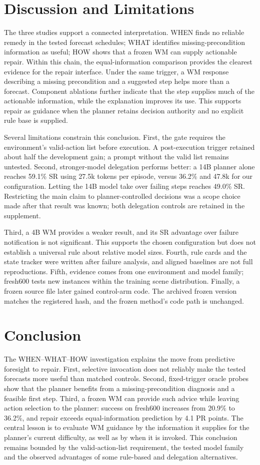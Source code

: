 \documentclass[runningheads]{llncs}
\begin{document}
\section{Discussion and Limitations}
The three studies support a connected interpretation. WHEN finds no reliable remedy in the tested forecast schedules; WHAT identifies missing-precondition information as useful; HOW shows that a frozen WM can supply actionable repair. Within this chain, the equal-information comparison provides the clearest evidence for the repair interface. Under the same trigger, a WM response describing a missing precondition and a suggested step helps more than a forecast. Component ablations further indicate that the step supplies much of the actionable information, while the explanation improves its use. This supports repair as guidance when the planner retains decision authority and no explicit rule base is supplied.

Several limitations constrain this conclusion. First, the gate requires the environment's valid-action list before execution. A post-execution trigger retained about half the development gain; a prompt without the valid list remains untested. Second, stronger-model delegation performs better: a 14B planner alone reaches 59.1\% SR using 27.5k tokens per episode, versus 36.2\% and 47.8k for our configuration. Letting the 14B model take over failing steps reaches 49.0\% SR. Restricting the main claim to planner-controlled decisions was a scope choice made after that result was known; both delegation controls are retained in the supplement.

Third, a 4B WM provides a weaker result, and its SR advantage over failure notification is not significant. This supports the chosen configuration but does not establish a universal rule about relative model sizes. Fourth, rule cards and the state tracker were written after failure analysis, and aligned baselines are not full reproductions. Fifth, evidence comes from one environment and model family; fresh600 tests new instances within the training scene distribution. Finally, a frozen source file later gained control-arm code. The archived frozen version matches the registered hash, and the frozen method's code path is unchanged.

\section{Conclusion}
The WHEN--WHAT--HOW investigation explains the move from predictive foresight to repair. First, selective invocation does not reliably make the tested forecasts more useful than matched controls. Second, fixed-trigger oracle probes show that the planner benefits from a missing-precondition diagnosis and a feasible first step. Third, a frozen WM can provide such advice while leaving action selection to the planner: success on fresh600 increases from 20.9\% to 36.2\%, and repair exceeds equal-information prediction by 4.1 PR points. The central lesson is to evaluate WM guidance by the information it supplies for the planner's current difficulty, as well as by when it is invoked. This conclusion remains bounded by the valid-action-list requirement, the tested model family and the observed advantages of some rule-based and delegation alternatives.
\end{document}
